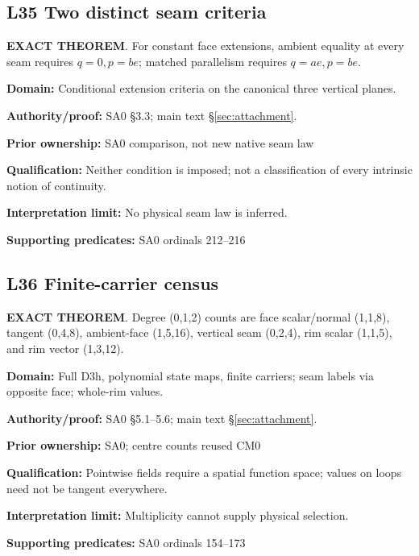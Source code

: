 \par\noindent\begin{minipage}{\linewidth}
\subsection*{L35 Two distinct seam criteria}
\textbf{EXACT THEOREM}. For constant face extensions, ambient equality at every seam requires \(q=0,p=be\); matched parallelism requires \(q=ae,p=be\).\par
\textbf{Domain:} Conditional extension criteria on the canonical three vertical planes.\par
\textbf{Authority/proof:} SA0 \S{}3.3; main text \S\ref{sec:attachment}.\par
\textbf{Prior ownership:} SA0 comparison, not new native seam law\par
\textbf{Qualification:} Neither condition is imposed; not a classification of every intrinsic notion of continuity.\par
\textbf{Interpretation limit:} No physical seam law is inferred.\par
\textbf{Supporting predicates:} SA0 ordinals 212--216\par
\end{minipage}\par\medskip
\par\noindent\begin{minipage}{\linewidth}
\subsection*{L36 Finite-carrier census}
\textbf{EXACT THEOREM}. Degree (0,1,2) counts are face scalar/normal (1,1,8), tangent (0,4,8), ambient-face (1,5,16), vertical seam (0,2,4), rim scalar (1,1,5), and rim vector (1,3,12).\par
\textbf{Domain:} Full D3h, polynomial state maps, finite carriers; seam labels via opposite face; whole-rim values.\par
\textbf{Authority/proof:} SA0 \S{}5.1--5.6; main text \S\ref{sec:attachment}.\par
\textbf{Prior ownership:} SA0; centre counts reused CM0\par
\textbf{Qualification:} Pointwise fields require a spatial function space; values on loops need not be tangent everywhere.\par
\textbf{Interpretation limit:} Multiplicity cannot supply physical selection.\par
\textbf{Supporting predicates:} SA0 ordinals 154--173\par
\end{minipage}\par\medskip
